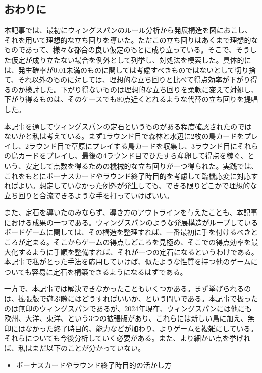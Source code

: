 \subsection{おわりに}
\begin{multicols}{2}
本記事では、最初にウィングスパンのルール分析から発展構造を図におこし、それを用いて理想的な立ち回りを導いた。ただこの立ち回りはあくまで理想的なものであって、様々な都合の良い仮定のもとに成り立っている。そこで、そうした仮定が成り立たない場合を例外として列挙し、対処法を模索した。具体的には、発生確率が0.01未満のものに関しては考慮すべきものではないとして切り捨て、それ以外のものに対しては、理想的な立ち回りと比べて得点効率が下がり得るのか検討した。下がり得ないものは理想的な立ち回りを柔軟に変えて対処し、下がり得るものは、そのケースでも80点近くとれるような代替の立ち回りを提唱した。
\par
本記事を通してウィングスパンの定石というものがある程度確認されたのではないかと私は考えている。まず1ラウンド目で森林と水辺に2枚の鳥カードをプレイし、2ラウンド目で草原にプレイする鳥カードを収集し、3ラウンド目にそれらの鳥カードをプレイし、最後の4ラウンド目でひたすら産卵して得点を稼ぐ、という、安定して点数を得るための機械的な立ち回りが一つ得られた。実践では、これをもとにボーナスカードやラウンド終了時目的を考慮して臨機応変に対応すればよい。想定していなかった例外が発生しても、できる限りどこかで理想的な立ち回りと合流できるような手を打っていけばいい。
\par
また、定石を導いたのみならず、導き方のアウトラインを与えたことも、本記事における成果の一つである。ウィングスパンのような発展構造がループしているボードゲームに関しては、その構造を整理すれば、一番最初に手を付けるべきところが定まる。そこからゲームの得点しどころを見極め、そこでの得点効率を最大化するように手順を整備すれば、それが一つの定石になるというわけである。本記事で私がとった手法を応用していけば、似たような性質を持つ他のゲームについても容易に定石を構築できるようになるはずである。
\par
一方で、本記事では解決できなかったこともいくつかある。まず挙げられるのは、拡張版で遊ぶ際にはどうすればいいか、という問いである。本記事で扱ったのは無印のウィングスパンであるが、2024年現在、ウィングスパンには他にも欧州、大洋、東洋、という3つの拡張版があり、これらには新しい鳥に加え、無印にはなかった終了時目的、能力などが加わり、よりゲームを複雑にしている。それらについても今後分析していく必要がある。また、より細かい点を挙げれば、私はまだ以下のことが分かっていない。
\begin{itemize}
  \item ボーナスカードやラウンド終了時目的の活かし方

\end{itemize}
\end{multicols}
